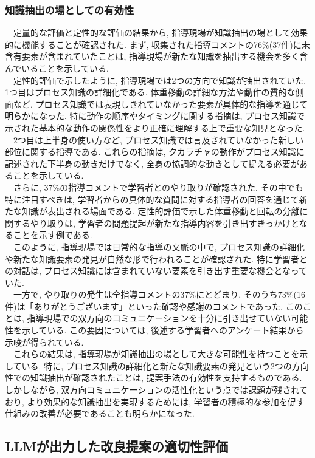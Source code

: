 \subsubsection{知識抽出の場としての有効性}
　定量的な評価と定性的な評価の結果から, 指導現場が知識抽出の場として効果的に機能することが確認された. まず, 収集された指導コメントの76\%(37件)に未含有要素が含まれていたことは, 指導現場が新たな知識を抽出する機会を多く含んでいることを示している.\\
　定性的評価で示したように, 指導現場では2つの方向で知識が抽出されていた. 1つ目はプロセス知識の詳細化である. 体重移動の詳細な方法や動作の質的な側面など, プロセス知識では表現しきれていなかった要素が具体的な指導を通じて明らかになった. 特に動作の順序やタイミングに関する指摘は, プロセス知識で示された基本的な動作の関係性をより正確に理解する上で重要な知見となった.\\
　2つ目は上半身の使い方など, プロセス知識では言及されていなかった新しい部位に関する指導である. これらの指摘は, クカラチャの動作がプロセス知識に記述された下半身の動きだけでなく, 全身の協調的な動きとして捉える必要があることを示している.\\
　さらに, 37\%の指導コメントで学習者とのやり取りが確認された. その中でも特に注目すべきは, 学習者からの具体的な質問に対する指導者の回答を通じて新たな知識が表出される場面である. 定性的評価で示した体重移動と回転の分離に関するやり取りは, 学習者の問題提起が新たな指導内容を引き出すきっかけとなることを示す例である.\\
　このように, 指導現場では日常的な指導の文脈の中で, プロセス知識の詳細化や新たな知識要素の発見が自然な形で行われることが確認された. 特に学習者との対話は, プロセス知識には含まれていない要素を引き出す重要な機会となっていた.\\
　一方で, やり取りの発生は全指導コメントの37\%にとどまり, そのうち73\%(16件)は「ありがとうございます」といった確認や感謝のコメントであった. このことは, 指導現場での双方向のコミュニケーションを十分に引き出せていない可能性を示している. この要因については, 後述する学習者へのアンケート結果から示唆が得られている.\\
　これらの結果は, 指導現場が知識抽出の場として大きな可能性を持つことを示している. 特に, プロセス知識の詳細化と新たな知識要素の発見という2つの方向性での知識抽出が確認されたことは, 提案手法の有効性を支持するものである. しかしながら, 双方向コミュニケーションの活性化という点では課題が残されており, より効果的な知識抽出を実現するためには, 学習者の積極的な参加を促す仕組みの改善が必要であることも明らかになった. 


\subsection{LLMが出力した改良提案の適切性評価}
